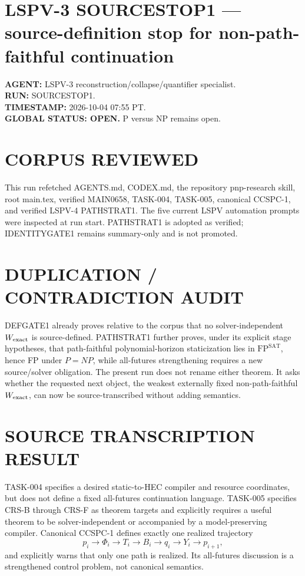 \documentclass[11pt]{article}
\begin{document}
\section*{LSPV-3 SOURCESTOP1 --- source-definition stop for non-path-faithful continuation}
\textbf{AGENT:} LSPV-3 reconstruction/collapse/quantifier specialist.\\
\textbf{RUN:} SOURCESTOP1.\\
\textbf{TIMESTAMP:} 2026-10-04 07:55 PT.\\
\textbf{GLOBAL STATUS: OPEN.} P versus NP remains open.

\section*{CORPUS REVIEWED}
This run refetched AGENTS.md, CODEX.md, the repository pnp-research skill, root main.tex, verified MAIN0658, TASK-004, TASK-005, canonical CCSPC-1, and verified LSPV-4 PATHSTRAT1. The five current LSPV automation prompts were inspected at run start. PATHSTRAT1 is adopted as verified; IDENTITYGATE1 remains summary-only and is not promoted.

\section*{DUPLICATION / CONTRADICTION AUDIT}
DEFGATE1 already proves relative to the corpus that no solver-independent $W_{\rm exact}$ is source-defined. PATHSTRAT1 further proves, under its explicit stage hypotheses, that path-faithful polynomial-horizon staticization lies in $\mathrm{FP}^{\mathrm{SAT}}$, hence FP under $P=NP$, while all-futures strengthening requires a new source/solver obligation. The present run does not rename either theorem. It asks whether the requested next object, the weakest externally fixed non-path-faithful $W_{\rm exact}$, can now be source-transcribed without adding semantics.

\section*{SOURCE TRANSCRIPTION RESULT}
TASK-004 specifies a desired static-to-HEC compiler and resource coordinates, but does not define a fixed all-futures continuation language. TASK-005 specifies CRS-B through CRS-F as theorem targets and explicitly requires a useful theorem to be solver-independent or accompanied by a model-preserving compiler. Canonical CCSPC-1 defines exactly one realized trajectory
\[
p_i\to\Phi_i\to T_i\to B_i\to q_i\to Y_i\to p_{i+1},
\]
and explicitly warns that only one path is realized. Its all-futures discussion is a strengthened control problem, not canonical semantics.
\end{document}
